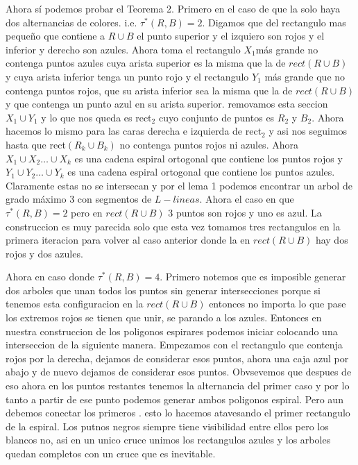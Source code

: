 \documentclass[11pt,a4paper]{article}
\begin{document}
Ahora sí podemos probar el Teorema 2. Primero en el caso de que la solo haya dos alternancias de colores. i.e. $\tau^*(R, B) = 2$. Digamos que del rectangulo mas pequeño que contiene a $R \cup B$ el punto superior y el izquiero son rojos y el inferior y derecho son azules. Ahora toma el rectangulo $X_1 $más grande no contenga puntos azules cuya arista superior es la misma que la de $rect(R \cup B)$ y cuya arista inferior tenga un punto rojo y el rectangulo $Y_1$ más grande que no contenga puntos rojos, que su arista inferior sea la misma que la de $rect(R \cup B)$ y que contenga un punto azul en su arista superior. removamos esta seccion $X_1 \cup Y_1$ y lo que nos queda es rect$_2$ cuyo conjunto de puntos es $R_2$ y $B_2$. Ahora hacemos lo mismo para las caras derecha e izquierda de rect$_2$ y asi nos seguimos hasta que rect$(R_k\cup B_k)$ no contenga puntos  rojos ni azules. Ahora $X_1 \cup X_2 \ldots \cup X_k$ es una cadena espiral ortogonal que contiene los puntos rojos y $Y_1 \cup Y_2 \ldots \cup Y_k$  es una cadena espiral ortogonal que contiene los puntos azules. Claramente estas no se intersecan y por el lema 1 podemos encontrar un arbol de grado máximo 3 con segmentos de $L-lineas$. Ahora el caso en que $\tau^*(R, B) = 2$ pero en $rect(R\cup B)$ 3 puntos son rojos y uno es azul. La construccion es muy parecida solo que esta vez tomamos tres rectangulos en la primera iteracion para volver al caso anterior donde la en $rect(R\cup B)$ hay dos rojos y dos azules.

Ahora en caso donde $\tau^*(R, B) = 4$. Primero notemos que es imposible generar dos arboles que unan todos los puntos sin generar intersecciones porque si tenemos esta configuracion en la $rect(R\cup B)$ entonces no importa lo que pase los extremos rojos se tienen que unir, se parando a los azules. Entonces en nuestra construccion de los poligonos espirares podemos iniciar colocando una interseccion de la siguiente manera. Empezamos con el rectangulo que contenja rojos por la derecha, dejamos de considerar esos puntos, ahora una caja azul por abajo y de nuevo dejamos de considerar esos puntos. Obvsevemos que despues de eso ahora en los puntos restantes tenemos la alternancia del primer caso y por lo tanto a partir de ese punto podemos generar ambos poligonos espiral. Pero aun debemos conectar los primeros . esto lo hacemos atavesando el primer rectangulo de la espiral. Los putnos negros siempre tiene visibilidad entre ellos pero los blancos no, asi en un unico cruce unimos los rectangulos azules y los arboles quedan completos con un cruce que es inevitable.
\end{document}
